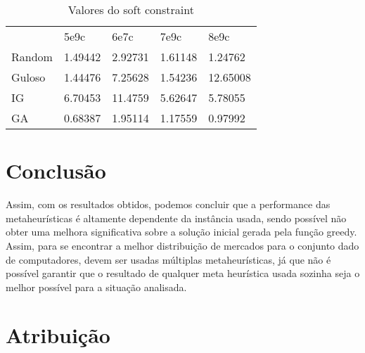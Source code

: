\documentclass[12pt]{article}
\begin{document}
\begin{table}[ht]
\caption{Valores do soft constraint}
\label{tab:my-table}
\begin{tabular}{lllll}
       & 5e9c    & 6e7c    & 7e9c    & 8e9c     \\
Random & 1.49442 & 2.92731 & 1.61148 & 1.24762  \\
Guloso & 1.44476 & 7.25628 & 1.54236 & 12.65008 \\
IG     & 6.70453 & 11.4759 & 5.62647 & 5.78055  \\
GA     & 0.68387 & 1.95114 & 1.17559 & 0.97992 
\end{tabular}
\end{table}

\section{Conclusão}


Assim, com os resultados obtidos, podemos concluir que a performance das metaheurísticas é altamente dependente da instância usada, sendo possível não obter uma melhora significativa sobre a solução inicial gerada pela função greedy. Assim, para se encontrar a melhor distribuição de mercados para o conjunto dado de computadores, devem ser usadas múltiplas metaheurísticas, já que não é possível garantir que o resultado de qualquer meta heurística usada sozinha seja o melhor possível para a situação analisada.



\section{Atribuição}
\end{document}
